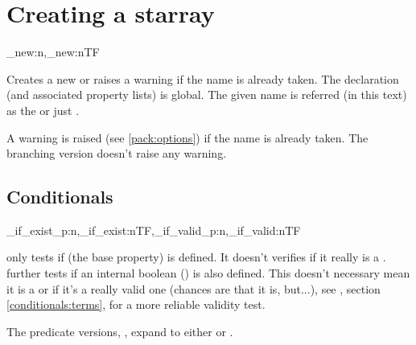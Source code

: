 \documentclass[10pt]{article}
\begin{document}
\section{Creating a starray}\label{pack:new}
\begin{codedescribe}{\starray_new:n,\starray_new:nTF}
\begin{codesyntax}%
\end{codesyntax}
Creates a new  or raises a warning  if the name is already taken. The declaration (and associated property lists) is global. The given name is referred (in this text) as the  or just . 
\end{codedescribe}
\begin{tsremark}
  A warning is raised (see \ref{pack:options}) if the name is already taken. The branching version doesn't raise any warning.
\end{tsremark}

\subsection{Conditionals}\label{conditionals:exist}
\begin{codedescribe}[code,EXP,new=2023/05/20]{\starray_if_exist_p:n,\starray_if_exist:nTF,\starray_if_valid_p:n,\starray_if_valid:nTF}
\begin{codesyntax}%
\end{codesyntax}
 only tests if  (the base property) is defined. It doesn't verifies if it really is a  .
 further tests if an internal boolean () is also defined. This doesn't necessary mean it is a  or if it's a really valid one (chances are that it is, but...), see , section \ref{conditionals:terms}, for a more reliable validity test.
\end{codedescribe}
\begin{tsremark}
The predicate versions, , expand to either  or .
\end{tsremark}
\end{document}

